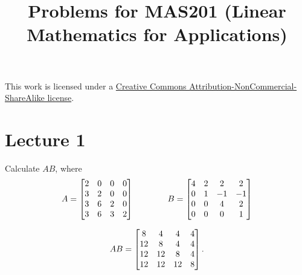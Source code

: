 \documentclass[a4paper]{amsart}
\title{Problems for MAS201 (Linear Mathematics for Applications)}
\renewenvironment{solution}{\SolutionInline}{\endSolutionInline}
\begin{document}
\maketitle

\begin{center}
 This work is licensed under a 
 \href{https://creativecommons.org/licenses/by-nc-sa/3.0/deed.en}{
  Creative Commons Attribution-NonCommercial-ShareAlike license}.
 
 \bigskip

 \doclicenseImage 
\end{center}

\newpage

\section{Lecture 1}

\begin{exercise}\label{ex-mat-prod-i}
 Calculate $AB$, where 
 \[ A = \left[\begin{matrix} 2&0&0&0 \\ 3&2&0&0 \\ 3&6&2&0 \\ 3&6&3&2 \end{matrix}\right] 
    \hspace{4em}
    B = \left[\begin{matrix} 4&2&2&2 \\ 0&1&-1&-1 \\ 0&0&4&2 \\ 0&0&0&1 \end{matrix}\right]
 \]
\end{exercise}
\begin{solution}
 \[ AB = \left[\begin{matrix}  8 &  4 &  4 &  4 \\
              12 &  8 &  4 &  4 \\
              12 & 12 &  8 &  4 \\
              12 & 12 & 12 &  8
         \end{matrix}\right] .
 \]
\end{solution}
\end{document}
